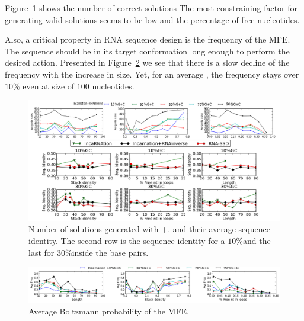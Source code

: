   Figure~\ref{fig:nb_sols_entropy} shows the number of correct
solutions 
The most constraining factor for generating valid
 solutions seems to be  low \GCContent and the percentage of free nucleotides. 


Also, a critical property in RNA sequence design is 
the frequency of the MFE. 
The sequence should be in its target conformation long enough to
perform the desired action. Presented in Figure~\ref{fig:freq} we see that
there is a slow decline of the frequency with the increase in size. Yet,
for an average \GCContent, the frequency stays over $10\%$ even
at size of $100$ nucleotides.


\begin{figure}[ht!]
	\centering
	\includegraphics[width=\textwidth]{Figures/nb_sols_entropy}
	\caption{Number of solutions generated with \ourprog+\RNAinverse. and their average sequence identity. 
	The second row is the sequence identity for a $10\%$\GC and the last for $30\%$\GC inside the base pairs. }
	\label{fig:nb_sols_entropy}
\end{figure}


\begin{figure}[ht!]
	\centering
	\includegraphics[width=\textwidth]{Figures/freq.png}
	\caption{Average Boltzmann probability of the MFE.}
	\label{fig:freq}
\end{figure}


